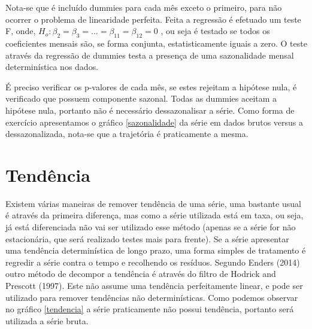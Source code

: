 \documentclass[a4paper,12pt,oneside,titlepage]{article}
\begin{document}
Nota-se que é incluído dummies para cada mês exceto o primeiro,
para não ocorrer o problema de linearidade perfeita. Feita a regressão é
efetuado um teste F, onde, $ H_o : \beta_2 = \beta_3 = ...= \beta_11 = \beta_12 = 0$ , ou seja é
testado se todos os coeficientes mensais são, se forma conjunta,
estatisticamente iguais a zero. O teste através da regressão de dummies
testa a presença de uma sazonalidade mensal determinística nos dados.

É preciso verificar os p-valores de cada mês, se estes rejeitam a
hipótese nula, é verificado que possuem componente sazonal. Todas as dummies aceitam a hipótese
nula, portanto não é necessário dessazonalisar a série. Como forma de
exercício apresentamos o gráfico \ref{sazonalidade} da série em dados brutos
versus a dessazonalizada, nota-se que a trajetória é praticamente a
mesma.

\fontsize{10pt}{\baselineskip}

\section*{Tendência}

Existem várias maneiras de remover tendência de uma série, uma
bastante usual é através da primeira diferença, mas como a série
utilizada está em taxa, ou seja, já está diferenciada não vai ser utilizado
esse método (apenas se a série for não estacionária, que será realizado
testes mais para frente).
Se a série apresentar uma tendência determinística de longo
prazo, uma forma simples de tratamento é regredir a série contra o
tempo e recolhendo os resíduos.
Segundo Enders (2014) outro método de decompor a tendência é
através do filtro de Hodrick and Prescott (1997). Este não assume uma
tendência perfeitamente linear, e pode ser utilizado para remover
tendências não determinísticas.
Como podemos observar no gráfico \ref{tendencia} a série praticamente
não possui tendência, portanto será utilizada a série bruta.


\fontsize{10pt}{\baselineskip}
\end{document}
